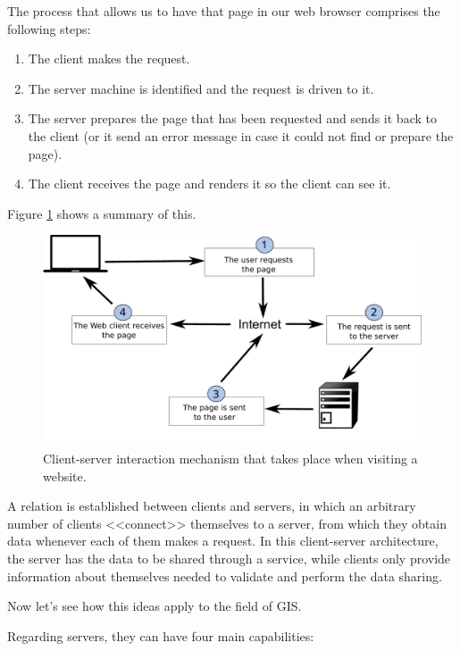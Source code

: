 The process that allows us to have that page in our web browser comprises the following steps:

\begin{enumerate}
	\item The client makes the request.
	\item The server machine is identified and the request is driven to it.
	\item The server prepares the page that has been requested and sends it back to the client (or it send an error message in case it could not find or prepare the page).
	\item The client receives the page and renders it so the client can see it.
\end{enumerate}


Figure \ref{Fig:How_internet_works} shows a summary of this.

\begin{figure}[!hbt]   
\centering
\includegraphics[width=\columnwidth]{Software/How_internet_works.pdf}
\caption{\small Client-server interaction mechanism that takes place when visiting a website.}
\label{Fig:How_internet_works} 
\end{figure}

A relation is established between clients and servers, in which an arbitrary number of clients <<connect>> themselves to a server, from which they obtain data whenever each of them makes a request. In this client-server architecture, the server has the data to be shared through a service, while clients only provide information about themselves needed to validate and perform the data sharing.

Now let's see how this ideas apply to the field of GIS.

Regarding servers, they can have four main capabilities:


